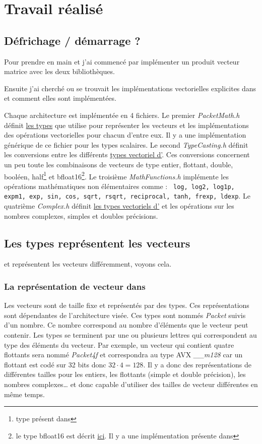 \section{Travail réalisé}

\subsection{Défrichage / démarrage ?}

Pour prendre en main \Eigen et \MIPP j'ai commencé par implémenter un produit
vecteur matrice avec les deux bibliothèques.

Ensuite j'ai cherché ou se trouvait les implémentations vectorielles explicites dans \Eigen
et comment elles sont implémentées.

Chaque architecture est implémentée en 4 fichiers. Le premier \emph{PacketMath.h}
définit \hyperref[typeEigen]{les types} que \Eigen utilise pour représenter les
vecteurs et les implémentations des opérations vectorielles pour chacun d'entre eux.
Il y a une implémentation générique de ce fichier pour les types scalaires. Le second
\emph{TypeCasting.h} définit les conversions entre les différents \hyperref[typeEigen]{types
vectoriel d'\Eigen}. Ces conversions concernent un peu toute les combinaisons
de vecteurs de type entier, flottant, double, booléen, half\footnote{type présent dans
\Eigen} et bfloat16\footnote{le type bfloat16 est décrit
\href{https://en.wikipedia.org/wiki/Bfloat16_floating-point_format}{ici}. Il y a une
implémentation présente dans \Eigen}. Le troisième \emph{MathFunctions.h}
implémente les opérations mathématiques non élémentaires comme : \texttt{ log, log2, log1p,
expm1, exp, sin, cos, sqrt, rsqrt, reciprocal, tanh, frexp, ldexp}. Le quatrième
\emph{Complex.h} définit \hyperref[typeEigen]{les types vectoriels d'\Eigen} et
les opérations sur les nombres complexes, simples et doubles précisions.

\subsection{Les types représentent les vecteurs}
\Eigen et \MIPP représentent les vecteurs différemment, voyons cela.

\label{typeEigen}
\subsubsection{La représentation de vecteur dans \Eigen}
{
  Les vecteurs sont de taille fixe et représentés par des types. Ces représentations sont
  dépendantes de l'architecture visée. Ces types sont nommés \emph{Packet} suivis d'un nombre.
  Ce nombre correspond au nombre d'éléments que le vecteur peut contenir. Les types se
  terminent par une ou plusieurs lettres qui correspondent au type des éléments du vecteur.
  Par exemple, un vecteur qui contient quatre flottants sera nommé \emph{Packet4f} et
  correspondra au type AVX \emph{__m128} car un flottant est codé sur 32 bits donc
  $32\cdot 4=128$. Il y a donc des représentations de différentes tailles pour les entiers,
  les flottants (simple et double précision), les nombres complexes\dots
  \Eigen et donc capable d'utiliser des tailles de vecteur différentes en même temps.
}

